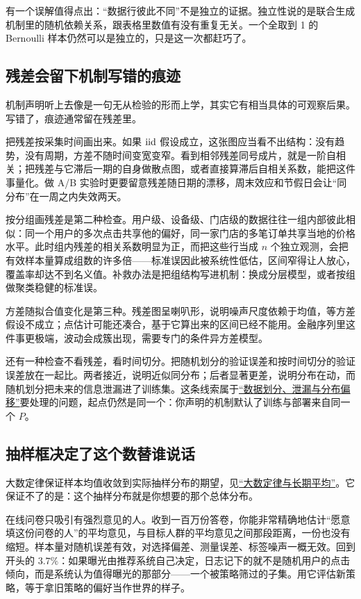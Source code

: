有一个误解值得点出：``数据行彼此不同''不是独立的证据。独立性说的是联合生成机制里的随机依赖关系，跟表格里数值有没有重复无关。一个全取到 1 的 Bernoulli 样本仍然可以是独立的，只是这一次都赶巧了。

\subsection{残差会留下机制写错的痕迹}

机制声明听上去像是一句无从检验的形而上学，其实它有相当具体的可观察后果。写错了，痕迹通常留在残差里。

把残差按采集时间画出来。如果 \(\mathrm{iid}\) 假设成立，这张图应当看不出结构：没有趋势，没有周期，方差不随时间变宽变窄。看到相邻残差同号成片，就是一阶自相关；把残差与它滞后一期的自身做散点图，或者直接算滞后自相关系数，能把这件事量化。做 A/B 实验时更要留意残差随日期的漂移，周末效应和节假日会让``同分布''在一周之内失效两天。

按分组画残差是第二种检查。用户级、设备级、门店级的数据往往一组内部彼此相似：同一个用户的多次点击共享他的偏好，同一家门店的多笔订单共享当地的价格水平。此时组内残差的相关系数明显为正，而把这些行当成 \(n\) 个独立观测，会把有效样本量算成组数的许多倍——标准误因此被系统性低估，区间窄得让人放心，覆盖率却达不到名义值。补救办法是把组结构写进机制：换成分层模型，或者按组做聚类稳健的标准误。

方差随拟合值变化是第三种。残差图呈喇叭形，说明噪声尺度依赖于均值，等方差假设不成立；点估计可能还凑合，基于它算出来的区间已经不能用。金融序列里这件事更极端，波动会成簇出现，需要专门的条件异方差模型。

还有一种检查不看残差，看时间切分。把随机划分的验证误差和按时间切分的验证误差放在一起比。两者接近，说明近似同分布；后者显著更差，说明分布在动，而随机划分把未来的信息泄漏进了训练集。这条线索属于\hyperref[sec:13-Machine-Learning/01-Learning-Problems-and-Evaluation/04]{``数据划分、泄漏与分布偏移''}要处理的问题，起点仍然是同一个：你声明的机制默认了训练与部署来自同一个 \(P\)。

\subsection{抽样框决定了这个数替谁说话}

大数定律保证样本均值收敛到实际抽样分布的期望，见\hyperref[sec:05-Probability/08-Limit-Theorems/02]{``大数定律与长期平均''}。它保证不了的是：这个抽样分布就是你想要的那个总体分布。

在线问卷只吸引有强烈意见的人。收到一百万份答卷，你能非常精确地估计``愿意填这份问卷的人''的平均意见，与目标人群的平均意见之间那段距离，一份也没有缩短。样本量对随机误差有效，对选择偏差、测量误差、标签噪声一概无效。回到开头的 \(3.7\%\)：如果曝光由推荐系统自己决定，日志记下的就不是随机用户的点击倾向，而是系统认为值得曝光的那部分——一个被策略筛过的子集。用它评估新策略，等于拿旧策略的偏好当作世界的样子。

